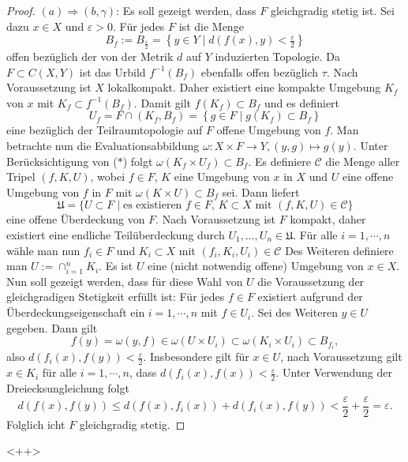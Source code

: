 \begin{proof}
  $(a) \Rightarrow (b, \gamma)$:
  Es soll gezeigt werden, dass $F$ gleichgradig stetig ist.
  Sei dazu $x \in X$ und $\varepsilon > 0$.
  Für jedes $F$ ist die Menge
  \begin{displaymath}
    B_f := B_{\frac{\varepsilon}{2}} = \left\{ y \in Y \mid d(f(x),y) < \tfrac{\varepsilon}{2}\right\} 
  \end{displaymath}
  offen bezüglich der von der Metrik $d$ auf $Y$ induzierten Topologie.
  Da $F \subset C(X,Y)$ ist das Urbild $f^{-1}(B_f)$ ebenfalls offen bezüglich $\tau$.
  Nach Voraussetzung ist $X$ lokalkompakt.
  Daher existiert eine kompakte Umgebung $K_f$ von $x$ mit $K_f \subset f^{-1}(B_f)$.
  Damit gilt $f(K_f) \subset B_f$ und es definiert
  \begin{displaymath}
    U_f = F \cap (K_f, B_f) = \left\{g \in F \mid g(K_f) \subset B_f \right\} \tag{$\ast$}
  \end{displaymath}
  eine bezüglich der Teilraumtopologie auf $F$ offene Umgebung von $f$.
  Man betrachte nun die Evaluationsabbildung $\omega: X \times F \to Y, (y,g) \mapsto g(y)$.
  Unter Berücksichtigung von ($\ast$) folgt $\omega(K_f \times U_f) \subset B_f$.
  Es definiere $\mathcal{C}$ die Menge aller Tripel $(f,K,U)$, wobei $f \in F$, $K$ eine Umgebung von $x$ in $X$ und $U$ eine offene Umgebung von $f$ in $F$ mit $\omega(K \times U) \subset B_f$ sei.
  Dann liefert
  \begin{displaymath}
    \mathfrak{U} = \{ U \subset F \mid \text{es existieren $f \in F$, $K \subset X$ mit $(f,K,U) \in \mathcal C$} \}
  \end{displaymath}
  eine offene Überdeckung von $F$.
  Nach Voraussetzung ist $F$ kompakt, daher existiert eine endliche Teilüberdeckung durch $U_1,\dots,U_n \in \mathfrak{U}$.
  Für alle $i = 1,\cdots,n$ wähle man nun $f_i \in F$ und $K_i \subset X$ mit $(f_i, K_i, U_i) \in \mathcal{C}$
  Des Weiteren definiere man $U := \cap_{i = 1}^n K_i$.
  Es ist $U$ eine (nicht notwendig offene) Umgebung von $x \in X$.
  Nun soll gezeigt werden, dass für diese Wahl von $U$ die Voraussetzung der gleichgradigen Stetigkeit erfüllt ist:
  Für jedes $f \in F$ existiert aufgrund der Überdeckungseigenschaft ein $i = 1,\cdots,n$ mit $f \in U_i$.
  Sei des Weiteren $y \in U$ gegeben.
  Dann gilt
  \begin{displaymath}
    f(y) = \omega(y,f) \in \omega(U \times U_i) \subset \omega(K_i \times U_i) \subset B_{f_i},
  \end{displaymath}
  also $d(f_i(x),f(y)) < \tfrac{\varepsilon}{2}$.
  Insbesondere gilt für $x \in U$, nach Voraussetzung gilt $x \in K_i$ für alle $i = 1,\cdots,n$, dass $d(f_i(x),f(x)) < \tfrac{\varepsilon}{2}$.
  Unter Verwendung der Dreiecksungleichung folgt
  \begin{displaymath}
    d(f(x),f(y)) \leq d(f(x),f_i(x)) + d(f_i(x),f(y)) < \frac{\varepsilon}{2} + \frac{\varepsilon}{2} = \varepsilon.
  \end{displaymath}
  Folglich icht $F$ gleichgradig stetig.

\end{proof}<++>
